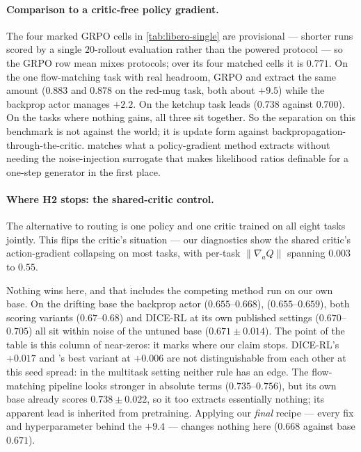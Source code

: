 \paragraph{Comparison to a critic-free policy gradient.} The four marked
GRPO cells in \cref{tab:libero-single} are provisional --- shorter runs
scored by a single $20$-rollout evaluation rather than the powered protocol
--- so the GRPO row mean mixes protocols; over its four matched cells it is
$0.771$. On the one
flow-matching task with real headroom, GRPO and \method{} extract the same
amount ($0.883$ and $0.878$ on the red-mug task, both about $+9.5$) while the backprop
actor manages $+2.2$. On the ketchup task \method{} leads ($0.738$ against $0.700$). On
the tasks where nothing gains, all three sit together. So the separation on
this benchmark is not \method{} against the world; it is update form against
backpropagation-through-the-critic. \method{} matches what a policy-gradient
method extracts without needing the noise-injection surrogate that makes
likelihood ratios definable for a one-step generator in the first place.

\paragraph{Where H2 stops: the shared-critic control.} The alternative to
routing is one policy and one critic trained on all eight tasks jointly.
This flips the critic's situation --- our diagnostics show the shared
critic's action-gradient collapsing on most tasks, with per-task
$\|\nabla_a Q\|$ spanning $0.003$ to $0.55$.



Nothing wins here, and that includes the competing method run on our own
base. On the drifting base the backprop actor ($0.655$--$0.668$),
\method{} ($0.655$--$0.659$), both scoring variants ($0.67$--$0.68$) and
DICE-RL at its own published settings ($0.670$--$0.705$) all sit within noise
of the untuned base ($0.671 \pm 0.014$). The point of the table is this
column of near-zeros: it marks where our claim stops. DICE-RL's $+0.017$ and \method{}'s best variant at
$+0.006$ are not distinguishable from each other at this seed spread: in
the multitask setting neither rule has an edge. The flow-matching pipeline looks stronger in absolute
terms ($0.735$--$0.756$), but its own base already scores
$0.738 \pm 0.022$, so it too extracts essentially nothing; its apparent lead
is inherited from pretraining. Applying our \emph{final} recipe --- every
fix and hyperparameter behind the $+9.4$ --- changes nothing here ($0.668$
against base $0.671$).

